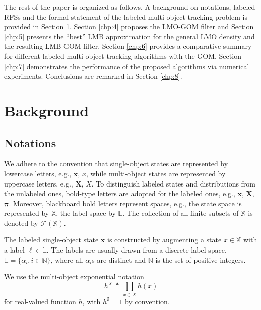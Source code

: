 \documentclass[journal]{IEEEtran}
\newcommand{\bX}{{\mathbf X}}
\newcommand{\bx}{{\mathbf x}}
\newcommand{\bpi}{{\boldsymbol\pi}}
\begin{document}
The rest of the paper is organized as follows. A background on  notations,  labeled RFSs and the formal statement of the labeled multi-object tracking problem is provided in Section \ref{chp:2}. Section \ref{chp:4} proposes the LMO-GOM filter and Section \ref{chp:5} presents the ``best'' LMB  approximation for the general LMO density and the resulting LMB-GOM filter. Section \ref{chp:6} provides a comparative summary for different labeled multi-object tracking algorithms with the GOM.  Section \ref{chp:7} demonstrates the performance of the proposed algorithms via numerical experiments. Conclusions are remarked in Section \ref{chp:8}.

\section{Background}\label{chp:2}
\subsection{Notations}
We adhere to the convention that single-object states are
represented by lowercase letters, e.g., $\bx$, $x$, while multi-object
states are represented by uppercase letters, e.g., $\bX$, $X$.  To distinguish labeled states and distributions from the
unlabeled ones, bold-type letters are adopted for the labeled
ones, e.g., $\bx$, $\bX$, $\bpi$. Moreover, blackboard bold letters represent spaces, e.g., the
state space is represented by $\mathbb{X}$, the label space by $\mathbb{L}$. The collection of all finite subsets of $\mathbb{X}$
is denoted by $\mathcal{F}(\mathbb{X})$.

The labeled single-object state $\bx$ is constructed by augmenting
a state $x\in\mathbb{X}$ with a label $\ell\in\mathbb{L}$. The labels are usually
drawn from a discrete label space, $\mathbb{L}=\{\alpha_i,i\in\mathbb{N}\}$, where
all $\alpha_i$s are distinct and  $\mathbb{N}$ is the set of positive
integers.

We use the multi-object exponential notation
\begin{equation}\label{multi-object exponential notation }
  h^{X}\triangleq{\prod}_{x\in X}h(x)
\end{equation}
for real-valued function $h$, with $h^\emptyset=1$ by convention.
\end{document}
